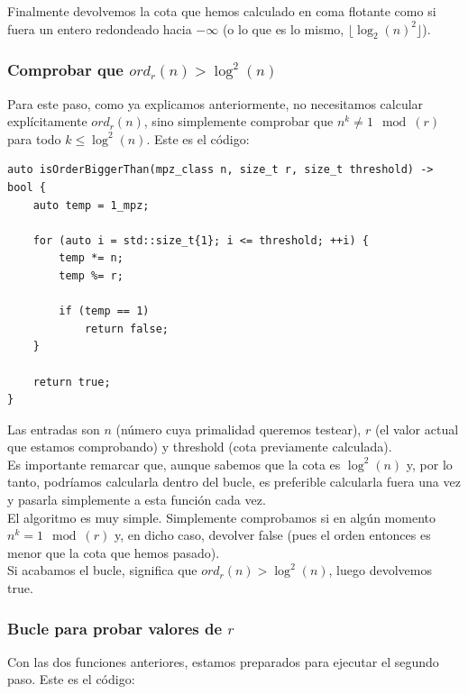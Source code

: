 Finalmente devolvemos la cota que hemos calculado en coma flotante como si fuera un entero redondeado hacia $-\infty$ (o lo que es lo mismo, $\lfloor \log_2(n)^2 \rfloor$).

\subsubsection{Comprobar que $ord_r(n) > \log^2(n)$}

Para este paso, como ya explicamos anteriormente, no necesitamos calcular explícitamente $ord_r(n)$, sino simplemente comprobar que $n^k \neq 1 \mod(r)$ para todo $k \leq \log^2(n)$. Este es el código:\\

\begin{lstlisting}
auto isOrderBiggerThan(mpz_class n, size_t r, size_t threshold) -> bool {
	auto temp = 1_mpz;
	
	for (auto i = std::size_t{1}; i <= threshold; ++i) {
		temp *= n;
		temp %= r;
		
		if (temp == 1)
			return false;
	}
	
	return true;
}
\end{lstlisting}

Las entradas son $n$ (número cuya primalidad queremos testear), $r$ (el valor actual que estamos comprobando) y threshold (cota previamente calculada).\\

Es importante remarcar que, aunque sabemos que la cota es $\log^2(n)$ y, por lo tanto, podríamos calcularla dentro del bucle, es preferible calcularla fuera una vez y pasarla simplemente a esta función cada vez.\\

El algoritmo es muy simple. Simplemente comprobamos si en algún momento $n^k = 1 \mod(r)$ y, en dicho caso, devolver false (pues el orden entonces es menor que la cota que hemos pasado).\\

Si acabamos el bucle, significa que $ord_r(n) > \log^2(n)$, luego devolvemos true.

\subsubsection{Bucle para probar valores de $r$}

Con las dos funciones anteriores, estamos preparados para ejecutar el segundo paso. Este es el código:\\

